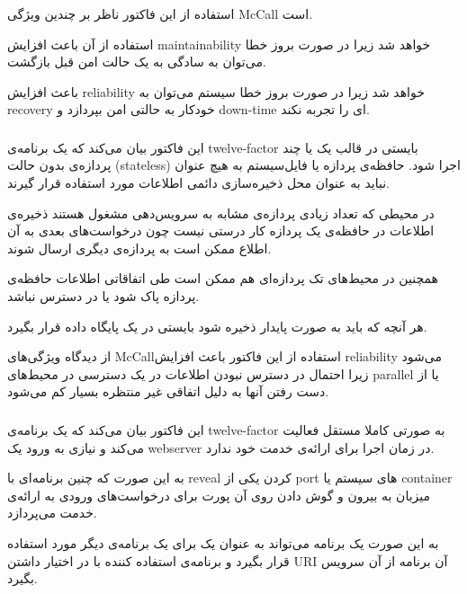 استفاده از این فاکتور ناظر بر چندین ویژگی McCall است.

استفاده از آن باعث افزایش maintainability خواهد شد زیرا در صورت بروز خطا می‌توان به سادگی به یک حالت امن قبل بازگشت.

باعث افزایش reliability خواهد شد زیرا در صورت بروز خطا سیستم می‌توان به recovery خودکار به حالتی امن بپردازد و down-time ای را تجربه نکند.





\subsubsection{}
این فاکتور بیان می‌کند که یک برنامه‌ی 
twelve-factor
بایستی در قالب یک یا چند پردازه‌ی بدون حالت
(stateless)
اجرا شود. حافظه‌ی پردازه یا فایل‌سیستم به هیچ عنوان نباید به عنوان محل ذخیره‌سازی دائمی اطلاعات مورد استفاده قرار گیرند.

در محیطی که تعداد زیادی پردازه‌ی مشابه به سرویس‌دهی مشغول هستند ذخیره‌ی اطلاعات در حافظه‌ی یک پردازه کار درستی نیست چون درخواست‌های بعدی به آن اطلاع ممکن است به پردازه‌ی دیگری ارسال شوند.

همچنین در محیط‌های تک پردازه‌ای هم ممکن است طی اتفاقاتی اطلاعات حافظه‌ی پردازه پاک شود یا در دسترس نباشد.

هر آنچه که باید به صورت پایدار ذخیره شود بایستی در یک پایگاه داده قرار بگیرد.

از دیدگاه ویژگی‌های McCallاستفاده از این فاکتور باعث افزایش reliability می‌شود زیرا احتمال در دسترس نبودن اطلاعات در یک دسترسی در محیط‌های parallel یا از دست رفتن آنها به دلیل اتفاقی غیر منتظره بسیار کم می‌شود.

\subsubsection{}
این فاکتور بیان می‌کند که یک برنامه‌ی 
twelve-factor
به صورتی کاملا  مستقل فعالیت می‌کند و نیازی به ورود یک webserver در زمان اجرا برای ارائه‌ی خدمت خود ندارد.

به این صورت که چنین برنامه‌ای با reveal کردن یکی از port های سیستم یا container میزبان به بیرون و گوش دادن روی آن پورت برای درخواست‌های ورودی به ارائه‌ی خدمت می‌پردازد.

به این صورت یک برنامه می‌تواند به عنوان یک 
برای یک برنامه‌ی دیگر مورد استفاده قرار بگیرد و برنامه‌ی استفاده کننده با در اختیار داشتن URI آن برنامه از آن سرویس بگیرد.


